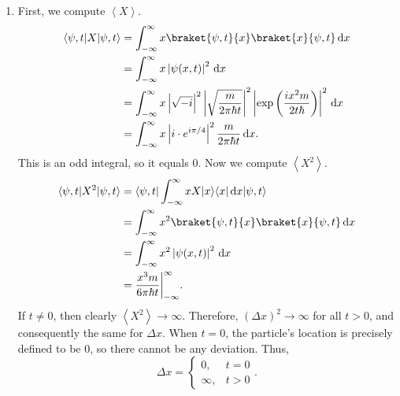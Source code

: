 \documentclass[11pt, letterpaper]{article}
\begin{document}
\begin{enumerate}
\begin{align*}
		,\end{align*}
		where I have used the well-known value of the Gaussian integral to complete the problem. There is an important step that must be explained, however. When I make the substitution $v=\sqrt{\frac{i}{\hbar } } u$, the integral becomes a contour integral along the straight line $C$ in the complex plane passing through the origin at an angle of $\pi /2$. However, since the integrand is holomorphic everywhere and thus has no singularities, and since the path $C$ is clearly homotopic to $\mathbb{R} $ when raised to the surface defined by the integrand (i.e. a continuous deformation $C \to \mathbb{R} $ exists without passing singularities, since there are none), it follows that integrating over $\mathbb{R} $ rather than $C$ will preserve the value of the integral. Hence, keeping the bounds at $\pm \infty $ is justified.
	\item First, we compute $\left\langle X \right\rangle $.
		\begin{align*}
			\bra{\psi ,t} X\ket{\psi ,t} &=\int_{-\infty }^{\infty } x \braket{\psi ,t}{x} \braket{x}{\psi ,t}  \,\mathrm{d} x\\
						     &=\int_{-\infty }^{\infty } x\left| \psi (x,t) \right| ^2 \,\mathrm{d} x\\
						     &=\int_{-\infty }^{\infty } x\left| \sqrt{-i}  \right| ^2\left| \sqrt{\frac{m}{2\pi \hbar t} }  \right| ^2\left| \exp \left( \frac{ix^2m}{2t\hbar }  \right)  \right| ^2 \,\mathrm{d} x\\
						     &=\int_{-\infty }^{\infty } x\left| i\cdot e^{i\pi /4}  \right| ^2\frac{m}{2\pi \hbar t}  \,\mathrm{d} x
		.\end{align*}
		This is an odd integral, so it equals 0. Now we compute $\left\langle X^2 \right\rangle $.
		\begin{align*}
			\bra{\psi ,t} X^2\ket{\psi ,t} &=\bra{\psi ,t} \int_{-\infty }^{\infty } xX\ket{x} \bra{x}  \,\mathrm{d} x\ket{\psi ,t} \\
						       &=\int_{-\infty }^{\infty } x^2\braket{\psi ,t}{x} \braket{x}{\psi ,t}  \,\mathrm{d} x\\
						       &=\int_{-\infty }^{\infty } x^2 \left| \psi (x,t) \right| ^2 \,\mathrm{d} x\\
						       &=\frac{x^3m}{6\pi \hbar t}\bigg|_{-\infty }^{\infty } 
		.\end{align*}
		If $t\neq 0$, then clearly $\left\langle X^2 \right\rangle \to \infty $. Therefore, $(\Delta x)^2\to \infty $ for all $t>0$, and consequently the same for $\Delta x$. When $t=0$, the particle's location is precisely defined to be $0$, so there cannot be any deviation. Thus,
		\[
			\Delta x=
			\begin{cases}
				0,&t=0\\
				\infty ,&t>0
			\end{cases}
		.\]
\end{enumerate}
\end{document}
